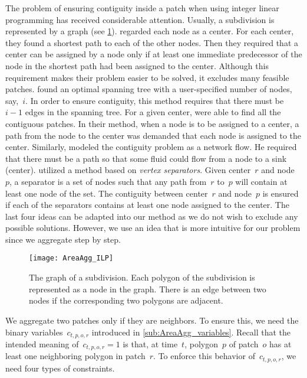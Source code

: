 \documentclass[acmsmall,natbib=false]{acmart}
\begin{document}
The problem of ensuring contiguity inside a patch 
when using integer linear programming 
has received considerable attention.
Usually, a subdivision is represented by a graph
(see \fig\ref{fig:AreaAgg_Variables_Graph}).
%
\textcite{Zoltners1983Territory} regarded each node as a center.
For each center, they found a shortest path 
to each of the other nodes.
Then they required that a center can be assigned 
by a node only if 
at least one immediate predecessor of the node 
in the shortest path had been assigned to the center.
Although this requirement makes their problem easier to be 
solved,
it excludes many feasible patches.
%
\textcite{Williams2002Contiguous} found an optimal spanning tree 
with a user-specified number of nodes, say,~$i$.
In order to ensure contiguity, this method requires that 
there must be~$i-1$ edges in the spanning tree.
%
For a given center, \textcite{Cova2000_Contiguity} 
were able to find all the contiguous patches.
In their method, when a node is to be assigned to a center, 
a path from the node to the center was demanded 
that each node is assigned to the center.
%
Similarly, \textcite{Shirabe2005Contiguity} modeled 
the contiguity problem as a network flow.
He required that there must be a path so that 
some fluid could flow from a node to a sink (center).
%
\textcite{Oehrlein2017Aggregation} utilized a method based 
on \emph{vertex separators}.	
Given center~$r$ and node~$p$, 
a separator is a set of nodes
such that any path from~$r$ to~$p$ 
will contain at least one node of the set.
The contiguity between center~$r$ and node~$p$ is ensured 
if each of the separators contains 
at least one node assigned to the center.
%
The last four ideas can be adapted into our method
as we do not wish to exclude any possible solutions.
However, we use an idea
that is more intuitive for our problem
since we aggregate step by step.


\begin{figure}[tb]
\centering
\texttt{[image: AreaAgg\_ILP]}
\caption{The graph of a subdivision.
	Each polygon of the subdivision is represented as a node 
	in the graph.
	There is an edge between two nodes
	if the corresponding two polygons are adjacent.
}
\label{fig:AreaAgg_Variables_Graph}
\end{figure} 

We aggregate two patches only if they are neighbors.
To ensure this, we need the binary variables~$c_{t,p,o,r}$
introduced in \sect\ref{sub:AreaAgg_variables}.
Recall that the intended meaning of~$c_{t,p,o,r}=1$ 
is that, at time~$t$, 
polygon~$p$ of patch~$o$ has 
at least one neighboring polygon in patch~$r$.
To enforce this behavior of~$c_{t,p,o,r}$, 
we need four types of constraints.
\end{document}
